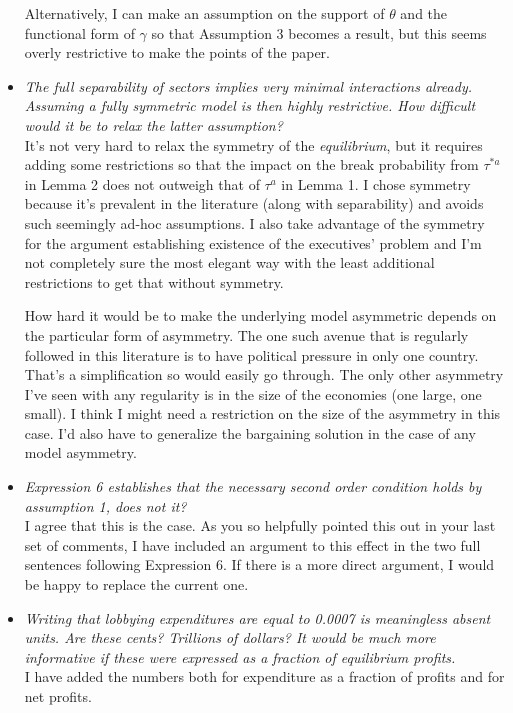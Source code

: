 \documentclass[12pt]{report}
\begin{document}
\begin{itemize}
	Alternatively, I can make an assumption on the support of $\theta$ and the functional form of $\gamma$ so that Assumption 3 becomes a result, but this seems overly restrictive to make the points of the paper.
	
  \item \textit{The full separability of sectors implies very minimal interactions already. Assuming a fully symmetric model is then highly restrictive. How difficult would it be to relax the latter assumption?} \\
	It's not very hard to relax the symmetry of the \textit{equilibrium}, but it requires adding some restrictions so that the impact on the break probability from $\tau^{*a}$ in Lemma 2 does not outweigh that of $\tau^a$ in Lemma 1. I chose symmetry because it's prevalent in the literature (along with separability) and avoids such seemingly ad-hoc assumptions. I also take advantage of the symmetry for the argument establishing existence of the executives' problem and I'm not completely sure the most elegant way with the least additional restrictions to get that without symmetry.
	
	How hard it would be to make the underlying model asymmetric depends on the particular form of asymmetry. The one such avenue that is regularly followed in this literature is to have political pressure in only one country. That's a simplification so would easily go through. The only other asymmetry I've seen with any regularity is in the size of the economies (one large, one small). I think I might need a restriction on the size of the asymmetry in this case. I'd also have to generalize the bargaining solution in the case of any model asymmetry.
	
  \item \textit{Expression 6 establishes that the necessary second order condition holds by assumption 1, does not it?} \\
	I agree that this is the case. As you so helpfully pointed this out in your last set of comments, I have included an argument to this effect in the two full sentences following Expression 6. If there is a more direct argument, I would be happy to replace the current one.
  \item \textit{Writing that lobbying expenditures are equal to 0.0007 is meaningless absent units. Are these cents? Trillions of dollars? It would be much more informative if these were expressed as a fraction of equilibrium profits.} \\
	I have added the numbers both for expenditure as a fraction of profits and for net profits.
	

\end{itemize}
\end{document}
